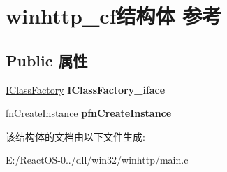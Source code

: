 \hypertarget{structwinhttp__cf}{}\section{winhttp\+\_\+cf结构体 参考}
\label{structwinhttp__cf}
\subsection*{Public 属性}
\begin{DoxyCompactItemize}
\item 
\mbox{\label{structwinhttp__cf_ab09f71ed70609b199b96f0288c10391b}} 
\hyperlink{interface_i_class_factory}{I\+Class\+Factory} {\bfseries I\+Class\+Factory\+\_\+iface}
\item 
\mbox{\label{structwinhttp__cf_ad50b329df28e23a2e5de4dfa4c2f2bc2}} 
fn\+Create\+Instance {\bfseries pfn\+Create\+Instance}
\end{DoxyCompactItemize}


该结构体的文档由以下文件生成\+:\begin{DoxyCompactItemize}
\item 
E\+:/\+React\+O\+S-\/0../dll/win32/winhttp/main.\+c\end{DoxyCompactItemize}
